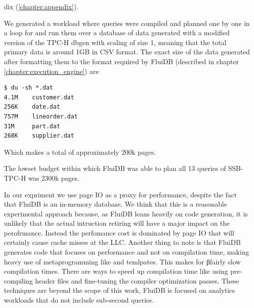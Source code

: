 dix (\ref{chapter:appendix}).

We generated a workload where queries were compiled and planned one by
one in a loop for and run them over a database of data generated with
a modified version of the TPC-H dbgen
\cite{perivolaropoulosFakedrakeSsbdbgen2021a} with scaling of size 1,
meaning that the total primary data is around 1GB in CSV format. The
exact size of the data generated after formatting them to the format
required by FluiDB (described in chapter
\ref{chapter:execution_engine}) are

\begin{verbatim}
$ du -sh *.dat
4.1M    customer.dat
256K    date.dat
757M    lineorder.dat
31M     part.dat
268K    supplier.dat
\end{verbatim}

Which makes a total of approximately 200k pages.

The lowset budget within which FluiDB was able to plan all 13 queries
of SSB-TPC-H was 2300k pages.

In our expriment we use page IO as a proxy for performance, despite
the fact that FluiDB is an in-memory database. We think that this is a
reasonable experimental approach because, as FluiDB leans heavily on
code generation, it is unlikely that the actual intruction retiring
will have a major impact on the perofrmance. Instead the perfomance
cost is dominated by page IO that will certainly cause cache misses at
the LLC. Another thing to note is that FluiDB generates code that
focuses on performance and not on compilation time, making heavy use
of metaprogramming like  and temlpates.  This makes for
βfairly slow compilation times. There are ways to speed up compilation
time like using pre-compiling header files
\cite{PrecompiledHeadersPCH} and fine-tuning the compiler optimization
passes. These techniques are beyond the scope of this work, FluiDB is
focused on analytics workloads that do not include sub-second queries.

